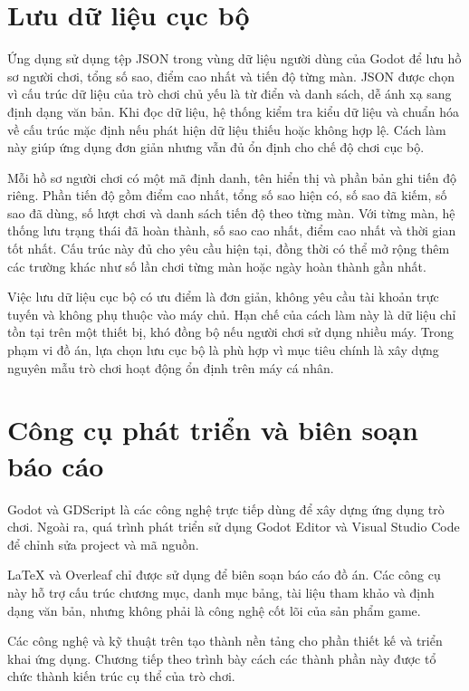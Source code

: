 \documentclass[../DoAn.tex]{subfiles}
\begin{document}
\section{Lưu dữ liệu cục bộ}
Ứng dụng sử dụng tệp JSON trong vùng dữ liệu người dùng của Godot để lưu hồ sơ người chơi, tổng số sao, điểm cao nhất và tiến độ từng màn. JSON được chọn vì cấu trúc dữ liệu của trò chơi chủ yếu là từ điển và danh sách, dễ ánh xạ sang định dạng văn bản. Khi đọc dữ liệu, hệ thống kiểm tra kiểu dữ liệu và chuẩn hóa về cấu trúc mặc định nếu phát hiện dữ liệu thiếu hoặc không hợp lệ. Cách làm này giúp ứng dụng đơn giản nhưng vẫn đủ ổn định cho chế độ chơi cục bộ.

Mỗi hồ sơ người chơi có một mã định danh, tên hiển thị và phần bản ghi tiến độ riêng. Phần tiến độ gồm điểm cao nhất, tổng số sao hiện có, số sao đã kiếm, số sao đã dùng, số lượt chơi và danh sách tiến độ theo từng màn. Với từng màn, hệ thống lưu trạng thái đã hoàn thành, số sao cao nhất, điểm cao nhất và thời gian tốt nhất. Cấu trúc này đủ cho yêu cầu hiện tại, đồng thời có thể mở rộng thêm các trường khác như số lần chơi từng màn hoặc ngày hoàn thành gần nhất.

Việc lưu dữ liệu cục bộ có ưu điểm là đơn giản, không yêu cầu tài khoản trực tuyến và không phụ thuộc vào máy chủ. Hạn chế của cách làm này là dữ liệu chỉ tồn tại trên một thiết bị, khó đồng bộ nếu người chơi sử dụng nhiều máy. Trong phạm vi đồ án, lựa chọn lưu cục bộ là phù hợp vì mục tiêu chính là xây dựng nguyên mẫu trò chơi hoạt động ổn định trên máy cá nhân.

\section{Công cụ phát triển và biên soạn báo cáo}
Godot và GDScript là các công nghệ trực tiếp dùng để xây dựng ứng dụng trò chơi. Ngoài ra, quá trình phát triển sử dụng Godot Editor và Visual Studio Code để chỉnh sửa project và mã nguồn.

LaTeX và Overleaf chỉ được sử dụng để biên soạn báo cáo đồ án. Các công cụ này hỗ trợ cấu trúc chương mục, danh mục bảng, tài liệu tham khảo và định dạng văn bản, nhưng không phải là công nghệ cốt lõi của sản phẩm game.


Các công nghệ và kỹ thuật trên tạo thành nền tảng cho phần thiết kế và triển khai ứng dụng. Chương tiếp theo trình bày cách các thành phần này được tổ chức thành kiến trúc cụ thể của trò chơi.
\end{document}
